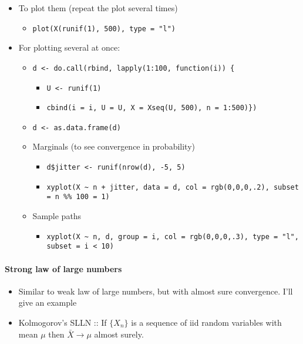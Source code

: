 \begin{itemize}
\begin{itemize}
\begin{itemize}
\end{itemize}
\item To plot them (repeat the plot several times)
\begin{itemize}
\item \texttt{plot(X(runif(1), 500), type = "l")}
\end{itemize}
\item For plotting several at once:
\begin{itemize}
\item \texttt{d <- do.call(rbind, lapply(1:100, function(i)) \{}
\begin{itemize}
\item \texttt{U <- runif(1)}
\item \texttt{cbind(i = i, U = U, X = Xseq(U, 500), n = 1:500)\})}
\end{itemize}
\item \texttt{d <- as.data.frame(d)}
\item Marginals (to see convergence in probability)
\begin{itemize}
\item \texttt{d\$jitter <- runif(nrow(d), -5, 5)}
\item \texttt{xyplot(X \textasciitilde{} n + jitter, data = d, col = rgb(0,0,0,.2), subset = n \%\% 100 = 1)}
\end{itemize}
\item Sample paths
\begin{itemize}
\item \texttt{xyplot(X \textasciitilde{} n, d, group = i, col = rgb(0,0,0,.3), type = "l", subset = i < 10)}
\end{itemize}
\end{itemize}
\end{itemize}
\end{itemize}
\paragraph{Strong law of large numbers}
\label{sec-1-5-3}

\begin{itemize}
\item Similar to weak law of large numbers, but with almost sure
       convergence.  I'll give an example
\item Kolmogorov's SLLN :: If $\{X_n\}$ is a sequence of iid random
          variables with mean $\mu$ then $\bar X \to \mu$ almost
          surely.
\end{itemize}
